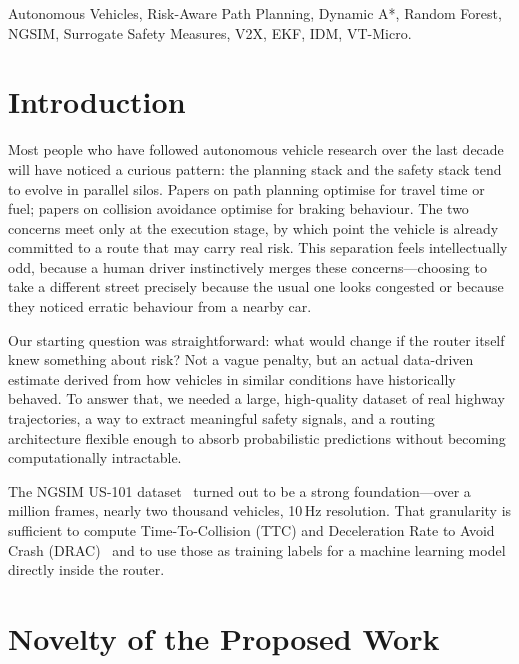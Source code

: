 \documentclass[conference]{IEEEtran}
\begin{document}
\begin{IEEEkeywords}
Autonomous Vehicles, Risk-Aware Path Planning, Dynamic A*, Random Forest,
NGSIM, Surrogate Safety Measures, V2X, EKF, IDM, VT-Micro.
\end{IEEEkeywords}

\section{Introduction}
\label{sec:intro}

Most people who have followed autonomous vehicle research over the last decade
will have noticed a curious pattern: the planning stack and the safety stack
tend to evolve in parallel silos. Papers on path planning optimise for travel
time or fuel; papers on collision avoidance optimise for braking behaviour.
The two concerns meet only at the execution stage, by which point the vehicle
is already committed to a route that may carry real risk. This separation
feels intellectually odd, because a human driver instinctively merges these
concerns---choosing to take a different street precisely because the usual
one looks congested or because they noticed erratic behaviour from a nearby
car.

Our starting question was straightforward: what would change if the router
itself knew something about risk? Not a vague penalty, but an actual
data-driven estimate derived from how vehicles in similar conditions have
historically behaved. To answer that, we needed a large, high-quality dataset
of real highway trajectories, a way to extract meaningful safety signals, and
a routing architecture flexible enough to absorb probabilistic predictions
without becoming computationally intractable.

The NGSIM US-101 dataset~\cite{NGSIM2006} turned out to be a strong
foundation---over a million frames, nearly two thousand vehicles, 10\,Hz
resolution. That granularity is sufficient to compute Time-To-Collision (TTC)
and Deceleration Rate to Avoid Crash (DRAC)~\cite{hayward1972near,
allen1978analysis} and to use those as training labels for a machine learning
model directly inside the router.

\section{Novelty of the Proposed Work}
\label{sec:novelty}
\end{document}
